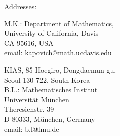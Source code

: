 \documentclass[12pt]{article}
\theoremstyle{boldplain}
\theoremstyle{bolddefinition}
\numberwithin{equation}{section}
\begin{document}
Addresses:

\noindent M.K.: Department of Mathematics, \\
University of California, Davis\\
CA 95616, USA\\
email: kapovich@math.ucdavis.edu

\noindent
KIAS, 85 Hoegiro, Dongdaemun-gu,\\ 
Seoul 130-722, South Korea\\



\noindent B.L.: Mathematisches Institut\\
Universit\"at M\"unchen \\
Theresienstr. 39\\ 
D-80333, M\"unchen, Germany\\ 
email: b.l@lmu.de
\end{document}
